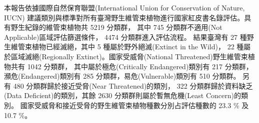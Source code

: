 \noindent 本報告依據國際自然保育聯盟(International Union for Conservation of Nature, IUCN)
建議類別與標準對所有臺灣野生維管束植物進行國家紅皮書名錄評估。具有野生紀錄的維管束植物共 5219 分類群，
其中 745 分類群不適用(Not Applicable)區域評估篩選條件， 4474 分類群進入評估流程。
結果臺灣有 27 種野生維管束植物已經滅絕，其中 5 種屬於野外絕滅(Extinct in the Wild)，
22 種屬於區域滅絕(Regionally Extinct)。國家受威脅(National Threatened)野生維管束植物共有 1042 分類群，
其中屬於極危(Critically Endangered)類別有 217 分類群，
瀕危(Endangered)類別有 285 分類群，易危(Vulnerable)類別有 510 分類群。
另有 480 分類群歸於接近受脅(Near Threatened)的類別，
322 分類群歸於資料缺乏(Data Deficient)的類別，其餘 2630 分類群則屬於暫無危機(Least Concern)的類別。
國家受威脅和接近受脅的野生維管束植物種數分別占評估種數的 23.3 \% 及 10.7 \%。 
